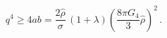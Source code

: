 \begin{equation}
q^4\geq 4ab=\frac{2\hat{\rho}}{\sigma}\,(1+\lambda)
\left(\frac{8\pi G_4}{3}\hat{\rho}\right)^2\,.\label{minimum}\end{equation}

